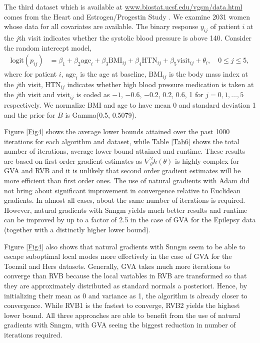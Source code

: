 \documentclass{statsoc}
\begin{document}
The third dataset which is available at \url{www.biostat.ucsf.edu/vgsm/data.html} comes from the Heart and Estrogen/Progestin Study \citep[HERS,][]{Hulley1998}. We examine 2031 women whose data for all covariates are available. The binary response $y_{ij}$ of patient $i$ at the $j$th visit indicates whether the systolic blood pressure is above 140. Consider the random intercept model,
\begin{equation*}
\begin{aligned}
\text{logit} (p_{ij}) &= \beta_1 + \beta_2 \text{age}_i +\beta_3 \text{BMI}_{ij} +\beta_4 \text{HTN}_{ij} + \beta_5 \text{visit}_{ij} + \theta_i, \quad 0 \leq j \leq 5,
\end{aligned}
\end{equation*}
where for patient $i$, $\text{age}_i$ is the age at baseline, $\text{BMI}_{ij}$ is the body mass index at the $j$th visit, $\text{HTN}_{ij}$ indicates whether high blood pressure medication is taken at the $j$th visit and $\text{visit}_{ij}$ is coded as $-1$, $-0.6$, $-0.2$, 0.2, 0.6, 1 for $j=0, 1, \dots, 5$ respectively. We normalize BMI and age to have mean 0 and standard deviation 1 and the prior for $B$ is Gamma(0.5, 0.5079).


Figure \ref{Fig4} shows the average lower bounds attained over the past 1000 iterations for each algorithm and dataset, while Table \ref{Tab6} shows the total number of iterations,  average lower bound attained and runtime. These results are based on first order gradient estimates as $\nabla_\theta^2 h(\theta)$ is highly complex for GVA and RVB and it is unlikely that second order gradient estimates will be more efficient than first order ones. The use of natural gradients with Adam did not bring about significant improvement in convergence relative to Euclidean gradients. In almost all cases, about the same number of iterations is required. However, natural gradients with Snngm yields much better results and runtime can be improved by up to a factor of 2.5 in the case of GVA for the Epilepsy data (together with a distinctly higher lower bound).

Figure \ref{Fig4} also shows that natural gradients with Snngm seem to be able to escape suboptimal local modes more effectively in the case of GVA for the Toenail and Hers datasets. Generally, GVA takes much more iterations to converge than RVB because the local variables in RVB are transformed so that they are approximately distributed as standard normals a posteriori. Hence, by initializing their mean as 0 and variance as 1, the algorithm is already closer to convergence. While RVB1 is the fastest to converge, RVB2 yields the highest lower bound. All three approaches are able to benefit from the use of natural gradients with Snngm, with GVA seeing the biggest reduction in number of iterations required.
\end{document}
